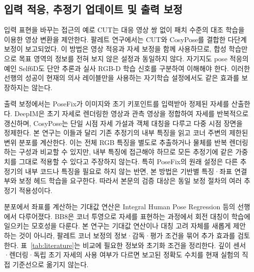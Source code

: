 \subsection{입력 적응, 추정기 업데이트 및 출력 보정}
입력 표현을 바꾸는 접근의 예로 CUT는 대응 영상 쌍 없이 패치 수준의 대조 학습을 이용한 영상 변환을 제안한다\cite{cut2020}. 팔레트 연구에서는 CUT와 CosyPose를 결합한 다단계 보정이 보고되었다\cite{elmoaqet2025}. 이 방법은 영상 적응과 자세 보정을 함께 사용하므로, 합성 학습만으로 목표 영역의 정보를 전혀 보지 않은 설정과 동일하지 않다. 자기지도 pose 적응의 예인 Self6D도 단안 추론과 실사 RGB-D 학습 신호를 구분하여 이해해야 한다\cite{self6d2020}. 이러한 선행의 성공이 현재의 의사 레이블만을 사용하는 자기학습 설정에서도 같은 효과를 보장하지는 않는다.

출력 보정에서는 PoseFix가 이미지와 초기 키포인트를 입력받아 정제된 자세를 산출한다\cite{posefix2019}. DeepIM은 초기 자세로 렌더링한 영상과 관측 영상을 정합하여 자세를 반복적으로 갱신하며\cite{deepim2018}, CosyPose는 단일 시점 자세 가설과 객체 대칭을 다루고 다중 시점 장면을 정제한다\cite{cosypose2020}. 본 연구는 이들과 달리 기존 추정기의 내부 특징을 읽고 코너 주변의 제한된 변위 분포를 계산한다. 이는 전체 RGB 특징을 별도로 추출하거나 물체를 반복 렌더링하는 구성과 비교할 수 있지만, 내부 특징에 접근해야 하므로 모든 추정기에 같은 가중치를 그대로 적용할 수 있다고 주장하지 않는다. 특히 PoseFix의 원래 설정은 다른 추정기의 내부 코드나 특징을 필요로 하지 않는 반면, 본 방법은 기반별 특징·좌표 연결부와 보정 헤드 학습을 요구한다. 따라서 본문의 검증 대상은 동일 보정 절차의 여러 추정기 적용성이다.

분포에서 좌표를 계산하는 기대값 연산은 Integral Human Pose Regression 등의 선행에서 다루어졌다\cite{integral2018}. BB8은 코너 투영으로 자세를 표현하는 과정에서 회전 대칭이 학습에 일으키는 모호성을 다룬다\cite{bb82017}. 본 연구는 기대값 연산이나 대칭 고려 자체를 새롭게 제안하는 것이 아니라, 팔레트 코너 보정의 정보·감독·평가 조건을 묶어 추가 효과를 검토한다. 표~\ref{tab:literature}는 비교에 필요한 정보와 초기화 조건을 정리한다. 깊이 센서·렌더링·독립 초기 자세의 사용 여부가 다르면 보고된 정확도 수치를 현재 실험의 직접 기준선으로 옮기지 않는다.
